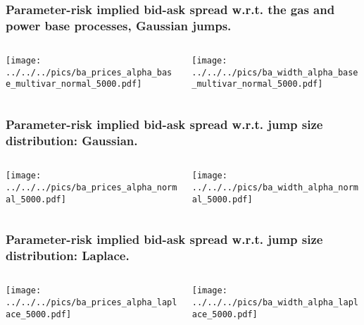 
\begin{frame}
\frametitle{Parameter-risk implied bid-ask spread w.r.t. the gas and power base processes, Gaussian jumps.}
\begin{columns}[t]
\begin{column}[l]{0.6\textwidth}
\texttt{[image: ../../../pics/ba\_prices\_alpha\_base\_multivar\_normal\_5000.pdf]}
\end{column}
\begin{column}[r]{0.6\textwidth}
\texttt{[image: ../../../pics/ba\_width\_alpha\_base\_multivar\_normal\_5000.pdf]}
\end{column}
\end{columns}
\end{frame}


\begin{frame}
\frametitle{Parameter-risk implied bid-ask spread w.r.t. jump size distribution: Gaussian.}
\begin{columns}[t]
\begin{column}[l]{0.6\textwidth}
\texttt{[image: ../../../pics/ba\_prices\_alpha\_normal\_5000.pdf]}
\end{column}
\begin{column}[r]{0.6\textwidth}
\texttt{[image: ../../../pics/ba\_width\_alpha\_normal\_5000.pdf]}
\end{column}
\end{columns}
\end{frame}

\begin{frame}
\frametitle{Parameter-risk implied bid-ask spread w.r.t. jump size distribution: Laplace.}
\begin{columns}[t]
\begin{column}[l]{0.6\textwidth}
\texttt{[image: ../../../pics/ba\_prices\_alpha\_laplace\_5000.pdf]}
\end{column}
\begin{column}[r]{0.6\textwidth}
\texttt{[image: ../../../pics/ba\_width\_alpha\_laplace\_5000.pdf]}
\end{column}
\end{columns}
\end{frame}



